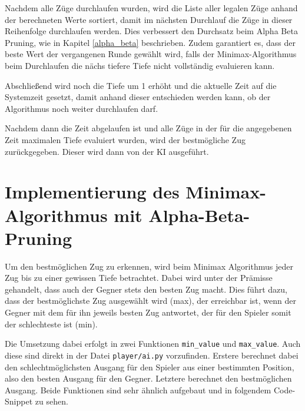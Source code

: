 Nachdem alle Züge durchlaufen wurden, wird die Liste aller legalen Züge
anhand der berechneten Werte sortiert, damit im nächsten Durchlauf die
Züge in dieser Reihenfolge durchlaufen werden. Dies verbessert den
Durchsatz beim Alpha Beta Pruning, wie in Kapitel \ref{alpha_beta} beschrieben. Zudem 
garantiert es, dass der beste Wert der vergangenen Runde gewählt
wird, falls der Minimax-Algorithmus beim Durchlaufen die nächs tiefere Tiefe
nicht vollständig evaluieren kann.

Abschließend wird noch die Tiefe um 1 erhöht und die aktuelle Zeit auf
die Systemzeit gesetzt, damit anhand dieser entschieden werden kann, ob
der Algorithmus noch weiter durchlaufen darf.

Nachdem dann die Zeit abgelaufen ist und alle Züge in der für die
angegebenen Zeit maximalen Tiefe evaluiert wurden, wird der bestmögliche Zug zurückgegeben. Dieser wird dann von der KI ausgeführt.

    \section{Implementierung des Minimax-Algorithmus mit
Alpha-Beta-Pruning}\label{implementierung-des-minimax-algorithmus-mit-alpha-beta-pruning}

Um den bestmöglichen Zug zu erkennen, wird beim Minimax Algorithmus
jeder Zug bis zu einer gewissen Tiefe betrachtet. Dabei wird unter der
Prämisse gehandelt, dass auch der Gegner stets den besten Zug macht.
Dies führt dazu, dass der bestmöglichste Zug ausgewählt wird (max), der
erreichbar ist, wenn der Gegner mit dem für ihn jeweils besten Zug
antwortet, der für den Spieler somit der schlechteste ist (min).

Die Umsetzung dabei erfolgt in zwei Funktionen \texttt{min\_value} und
\texttt{max\_value}. Auch diese sind direkt in der Datei
\texttt{player/ai.py} vorzufinden. Erstere berechnet dabei den schlechtmöglichsten Ausgang für den Spieler aus einer bestimmten Position, also
den besten Ausgang für den Gegner. Letztere berechnet den bestmöglichen Ausgang. Beide Funktionen sind sehr ähnlich aufgebaut und in
folgendem Code-Snippet zu sehen.


